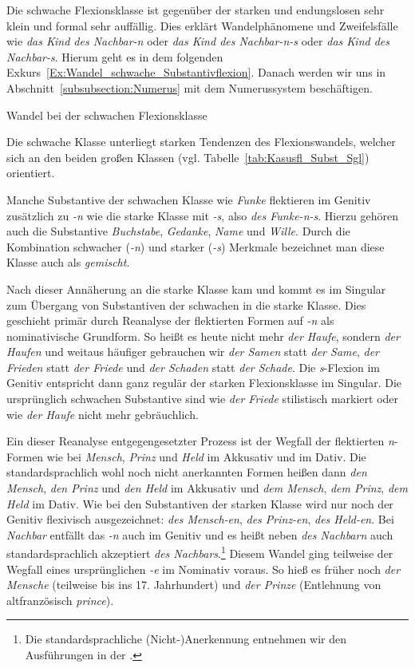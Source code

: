 Die schwache Flexionsklasse ist gegenüber der starken und endungslosen sehr klein und formal sehr auffällig. Dies erklärt Wandelphänomene und Zweifelsfälle wie \textit{das Kind des Nachbar-n} oder \textit{das Kind des Nachbar-n-s} oder \textit{das Kind des Nachbar-s}. Hierum geht es in dem folgenden Exkurs~\ref{Ex:Wandel_schwache_Substantivflexion}. Danach werden wir uns in Abschnitt~\ref{subsubsection:Numerus} mit dem Numerussystem beschäftigen. 


\begin{Exkurs}{Wandel bei der schwachen Flexionsklasse}\label{Ex:Wandel_schwache_Substantivflexion}
    
Die schwache Klasse unterliegt starken Tendenzen des Flexionswandels, welcher sich an den beiden großen Klassen (vgl. Tabelle~\ref{tab:Kasusfl_Subst_Sgl}) orientiert. 

Manche Substantive der schwachen Klasse wie \textit{Funke} flektieren im Genitiv zusätzlich zu \textit{-n} wie die starke Klasse mit \textit{-s}, also \textit{des Funke-n-s}. Hierzu gehören auch die Substantive \textit{Buchstabe}, \textit{Gedanke}, \textit{Name} und \textit{Wille}. Durch die Kombination schwacher (\textit{-n}) und starker (\textit{-s}) Merkmale bezeichnet man diese Klasse auch als \textit{gemischt}.

Nach dieser Annäherung an die starke Klasse kam und kommt es im Singular zum Übergang von Substantiven der schwachen in die starke Klasse. Dies geschieht primär durch Reanalyse der flektierten Formen auf \textit{-n} als nominativische Grundform. So heißt es heute nicht mehr \textit{der Haufe}, sondern \textit{der Haufen} und weitaus häufiger gebrauchen wir \textit{der Samen} statt \textit{der Same}, \textit{der Frieden} statt \textit{der Friede} und \textit{der Schaden} statt \textit{der Schade}. Die \textit{s}-Flexion im Genitiv entspricht dann ganz regulär der starken Flexionsklasse im Singular. Die ursprünglich schwachen Substantive sind wie \textit{der Friede} stilistisch markiert oder wie \textit{der Haufe} nicht mehr gebräuchlich. 

Ein dieser Reanalyse entgegengesetzter Prozess ist der Wegfall der flektierten \textit{n}-Formen wie bei \textit{Mensch}, \textit{Prinz} und \textit{Held} im Akkusativ und im Dativ. Die standardsprachlich wohl noch nicht anerkannten Formen heißen dann \textit{den Mensch}, \textit{den Prinz} und \textit{den Held} im Akkusativ und \textit{dem Mensch}, \textit{dem Prinz}, \textit{dem Held} im Dativ. Wie bei den Substantiven der starken Klasse wird nur noch der Genitiv flexivisch ausgezeichnet: \textit{des Mensch-en}, \textit{des Prinz-en}, \textit{des Held-en}. Bei \textit{Nachbar} entfällt das \textit{-n} auch im Genitiv und es heißt neben \textit{des Nachbarn} auch standardsprachlich akzeptiert \textit{des Nachbars}.\footnote{Die standardsprachliche (Nicht-)Anerkennung entnehmen wir den Ausführungen in der \citet[717--718, §1244--1248]{Duden2022}.} Diesem Wandel ging teilweise der Wegfall eines ursprünglichen \textit{-e} im Nominativ voraus. So hieß es früher noch \textit{der Mensche} (teilweise bis ins 17. Jahrhundert) und \textit{der Prinze} (Entlehnung von altfranzösisch \textit{prince}).


\end{Exkurs}
